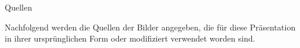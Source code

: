 %
%
%
%



\begin{frame}[allowframebreaks]{Quellen}
 
  
  Nachfolgend werden die Quellen der Bilder angegeben, 
  die für diese Präsentation in ihrer ursprünglichen Form oder modifiziert verwendet worden sind.

  \nocite{*}

  {\tiny 
%  
    \printbibliography %
  }
\end{frame}